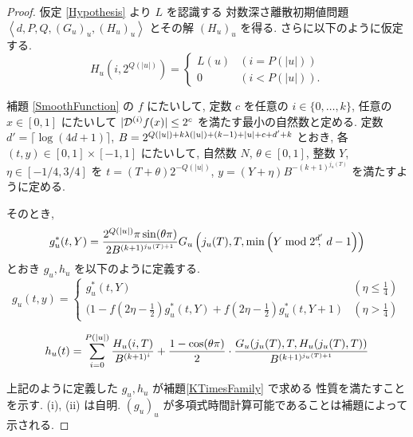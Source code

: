  \begin{proof}
  仮定 \ref{Hypothesis} より $L$ を認識する 
  対数深さ離散初期値問題 $\left< d, P, Q,(G_u)_u,(H_u)_u \right>$
  とその解 $(H_u)_u$ を得る.
  さらに以下のように仮定する.
  \begin{equation}
   H_u(i, 2^{Q(|u|)}) = \begin{cases}
			L(u) & (i=P(|u|)) \\
			0 & (i<P(|u|)).
			\end{cases}
  \end{equation}

    補題 \ref{SmoothFunction} の $f$ にたいして, 
 定数 $c$ を任意の $i \in \{0, \dots, k\}$, 任意の $x \in [0,1]$ にたいして $|\mathcal D^{(i)} f(x)| \le 2^c$ を満たす最小の自然数と定める.
 定数 $d' = \lceil \log (4d + 1) \rceil$, 
 $B = 2^{{Q(|u|)} + k {\lambda(|u|)} + (k - 1) + |u| + c + d' + k}$ とおき, 
 各 $(t, y) \in [0,1] \times [-1, 1]$ にたいして,
 自然数 $N$, $\theta \in [0,1]$, 整数 $Y$, $\eta \in [-1/4, 3/4]$ を
 $t = (T + \theta)2^{-Q(|u|)}$, $y = (Y + \eta)B^{-(k+1)^{j_u(T)}}$ 
  を満たすように定める.
 
 そのとき,
 \begin{equation}
  g^*_u(t, Y) = \frac{2^{Q(|u|)} \pi \sin (\theta\pi)}{2 B^{(k+1)^{j_u(T)+1}}}
   G_u\left( j_u(T), T, \min \left(Y \bmod 2^{d'}\!\!\!,\ d-1 \right) \right)
 \end{equation}
 とおき $g_u, h_u$ を以下のように定義する.
 \begin{equation}
  g_u(t,y) 
  = \begin{cases}
     g^*_u(t, Y)& (\eta \le \frac 1 4) \\
     ( 1-f \left( 2\eta - \frac 1 2 \right)g^*_u(t, Y) 
     + f \left( 2\eta -  \frac 1 2 \right) g^*_u(t, Y+1)
     & (\eta > \frac 1 4)
    \end{cases}
  \label{ktimes:eq:gu}
 \end{equation}

 \begin{equation} 
  h_u(t) = \sum^{{P(|u|)}}_{i=0} \frac{H_u(i, T)}{B^{(k+1)^i}}
  + \frac{1-\cos(\theta\pi)}{2} 
  \cdot \frac{G_u(j_u(T), T, H_u(j_u(T), T))}{B^{(k+1)^{j_u(T)+1}}}
  \label{ktimes:eq:hu}
 \end{equation}

 上記のように定義した $g_u, h_u$ が補題\ref{KTimesFamily} で求める
 性質を満たすことを示す. (i), (ii) は自明. 
 $(g_u)_u$ が多項式時間計算可能であることは補題によって示される.


\end{proof}
